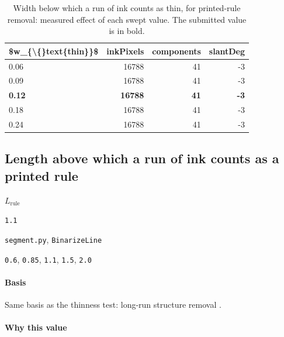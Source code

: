 \begin{table}[htbp]
\centering
\small
\caption{Width below which a run of ink counts as thin, for printed-rule removal: measured effect of each swept value. The submitted value is in bold.}
\begin{tabular}{lrrr}
\toprule
\$w\_\{\textbackslash\{\}text\{thin\}\}\$ & \textsf{inkPixels} & \textsf{components} & \textsf{slantDeg} \\
\midrule
0.06 & 16788 & 41 & -3 \\
0.09 & 16788 & 41 & -3 \\
\bfseries 0.12 & \bfseries 16788 & \bfseries 41 & \bfseries -3 \\
0.18 & 16788 & 41 & -3 \\
0.24 & 16788 & 41 & -3 \\
\bottomrule
\end{tabular}
\end{table}

\subsection{Length above which a run of ink counts as a printed rule}

\label{coef:binarize-rulelen}

\begin{description}[leftmargin=5.2em,style=sameline]

\item[Symbol] $L_{\text{rule}}$

\item[Value] \texttt{1.1}

\item[Source] \texttt{segment.py}, \texttt{BinarizeLine}

\item[Swept] \texttt{0.6}, \texttt{0.85}, \texttt{1.1}, \texttt{1.5}, \texttt{2.0}

\end{description}

\paragraph{Basis}

Same basis as the thinness test: long-run structure removal \cite{haralick1987,shafait2008}.

\paragraph{Why this value}

